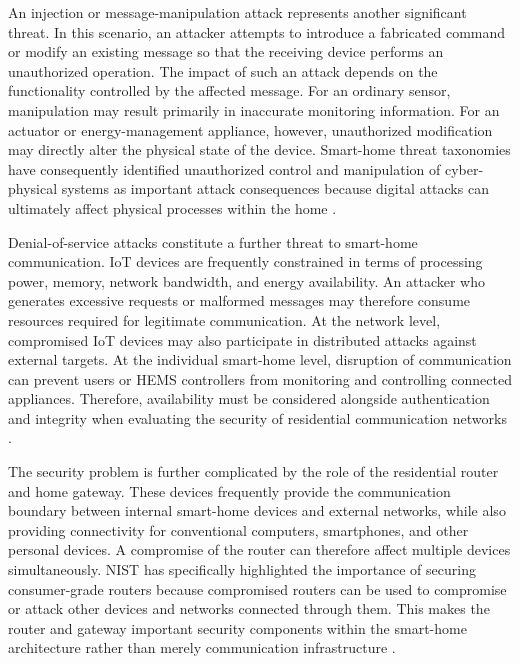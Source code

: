 An injection or message-manipulation attack represents another significant threat. In this scenario, an attacker attempts to introduce a fabricated command or modify an existing message so that the receiving device performs an unauthorized operation. The impact of such an attack depends on the functionality controlled by the affected message. For an ordinary sensor, manipulation may result primarily in inaccurate monitoring information. For an actuator or energy-management appliance, however, unauthorized modification may directly alter the physical state of the device. Smart-home threat taxonomies have consequently identified unauthorized control and manipulation of cyber-physical systems as important attack consequences because digital attacks can ultimately affect physical processes within the home \citep{heartfieldTaxonomyCyberphysicalThreats2018}.

Denial-of-service attacks constitute a further threat to smart-home communication. IoT devices are frequently constrained in terms of processing power, memory, network bandwidth, and energy availability. An attacker who generates excessive requests or malformed messages may therefore consume resources required for legitimate communication. At the network level, compromised IoT devices may also participate in distributed attacks against external targets. At the individual smart-home level, disruption of communication can prevent users or HEMS controllers from monitoring and controlling connected appliances. Therefore, availability must be considered alongside authentication and integrity when evaluating the security of residential communication networks \citep{antonakakisUnderstandingMiraiBotnet}.

The security problem is further complicated by the role of the residential router and home gateway. These devices frequently provide the communication boundary between internal smart-home devices and external networks, while also providing connectivity for conventional computers, smartphones, and other personal devices. A compromise of the router can therefore affect multiple devices simultaneously. NIST has specifically highlighted the importance of securing consumer-grade routers because compromised routers can be used to compromise or attack other devices and networks connected through them. This makes the router and gateway important security components within the smart-home architecture rather than merely communication infrastructure \citep{megasRecommendedCybersecurityRequirements2024}.

